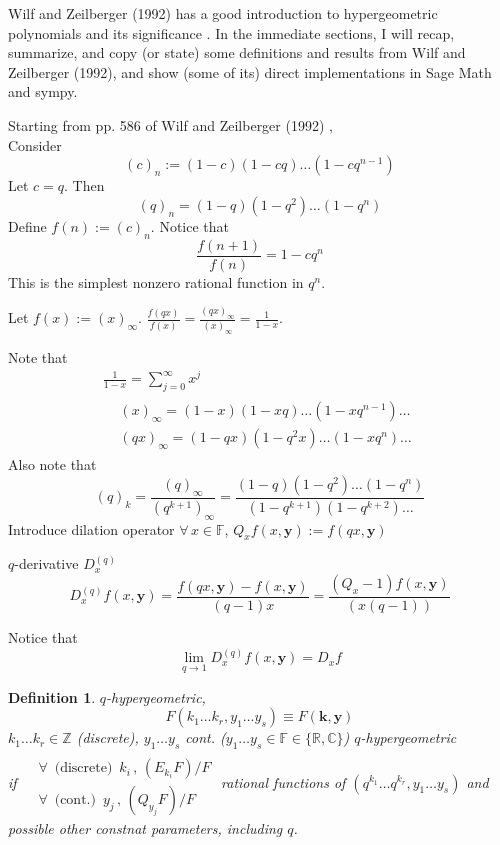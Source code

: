 \documentclass[10pt]{amsart}
\newtheorem{definition}{Definition}
\begin{document}
\begin{multicols*}{2}
Wilf and Zeilberger (1992) has a good introduction to hypergeometric polynomials and its significance \cite{HWilfDZeilberger1992}.  In the immediate sections, I will recap, summarize, and copy (or state) some definitions and results from  Wilf and Zeilberger (1992), and show (some of its) direct implementations in Sage Math and sympy.    

Starting from pp. 586 of Wilf and Zeilberger (1992) \cite{HWilfDZeilberger1992},  \\
Consider 
\[
(c)_n := (1-c)(1-cq) \dots (1-cq^{n-1})
\]
Let $c=q$.  Then
\[
(q)_n = (1-q)(1-q^2)\dots (1-q^n)
\]
Define $f(n):= (c)_n$.  Notice that 
\[
\frac{f(n+1)}{f(n)} = 1 - cq^n
\]
This is the simplest nonzero rational function in $q^n$.  

Let $f(x):=(x)_{\infty}$.  $\frac{f(qx)}{f(x)} = \frac{(qx)_{\infty} }{(x)_{\infty}} = \frac{1}{1-x}$.  

Note that 
\[
\begin{gathered}
  \frac{1}{1-x} = \sum_{j=0}^{\infty}x^j \\ 
  \begin{aligned}
    & (x)_{\infty} = (1-x)(1-xq) \dots (1-xq^{n-1}) \dots \\ 
    & (qx)_{\infty} = (1-qx)(1-q^2x)\dots (1-xq^n) \dots
\end{aligned}
\end{gathered}
\]
Also note that 
\[
(q)_k  =\frac{ (q)_{\infty} }{ (q^{k+1})_{\infty}} = \frac{(1-q)(1-q^2) \dots (1-q^n) }{ (1-q^{k+1})(1-q^{k+2})\dots }
\]
Introduce dilation operator $\forall \, x \in \mathbb{F}$, $Q_xf(x,\mathbf{y}) := f(qx,\mathbf{y})$

$q$-derivative $D_x^{(q)}$
\[
D_x^{(q)}f(x,\mathbf{y}) = \frac{f(qx,\mathbf{y}) - f(x,\mathbf{y}) }{(q-1)x} = \frac{(Q_x -1)f(x,\mathbf{y})}{(x(q-1) ) }
\]

Notice that 
\[
\lim_{q\to 1} D^{(q)}_xf(x,\mathbf{y}) = D_x f
\]

\begin{definition}
  $q$-hypergeometric,
\[
F(k_1 \dots k_r, y_1 \dots y_s) \equiv F(\mathbf{k},\mathbf{y})
\]
$k_1 \dots k_r \in \mathbb{Z}$ (discrete), $y_1 \dots y_s$ cont. ($y_1 \dots y_s \in \mathbb{F} \in \lbrace \mathbb{R}, \mathbb{C} \rbrace$) \emph{$q$-hypergeometric} \\

if $\begin{aligned} & \quad \\ 
  & \forall \,  \text{ (discrete) } \, k_i \, , \, (E_{k_i}F)/F \\ 
  & \forall \, \text{ (cont.) } \, y_j \, , \, (Q_{y_j}F)/F \end{aligned}$ rational functions of $(q^{k_1} \dots q^{k_r}, y_1 \dots y_s)$ and possible other constnat parameters, including $q$.  
\end{definition}


\end{multicols*}
\end{document}
